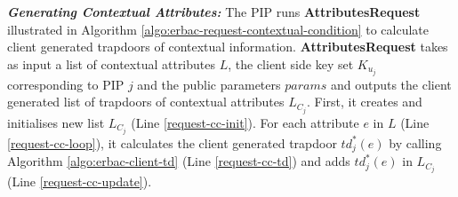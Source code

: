 \documentclass[epsfig,a4paper,11pt,titlepage]{book}
\numberwithin{algorithm}{chapter}
\begin{document}
\noindent \emph{\textbf{Generating Contextual Attributes:}} 
The \gls{PIP} runs \textbf{AttributesRequest} illustrated in Algorithm \ref{algo:erbac-request-contextual-condition} to calculate client generated trapdoors of contextual information. \textbf{AttributesRequest} takes as input a list of contextual attributes $L$, the client side key set $K_{u_j}$ corresponding to \gls{PIP} $j$ and the public parameters $params$ and outputs the client generated list of trapdoors of contextual attributes $L_{C_j}$. First, it creates and initialises new list $L_{C_j}$ (Line \ref{request-cc-init}). For each attribute $e$ in $L$ (Line \ref{request-cc-loop}), it calculates the client generated trapdoor $td^*_j (e)$ by calling Algorithm \ref{algo:erbac-client-td} (Line \ref{request-cc-td}) and adds $td^*_j (e)$ in $L_{C_j}$ (Line \ref{request-cc-update}).
\end{document}
